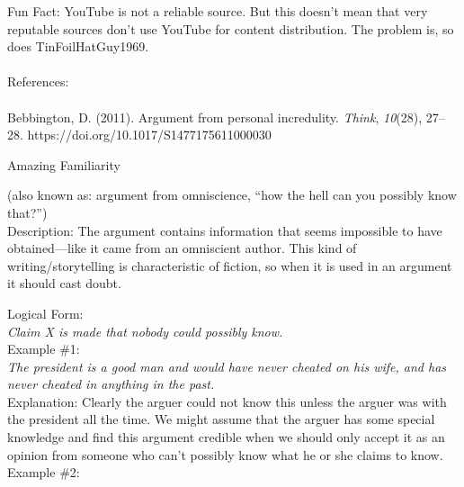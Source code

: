 \documentclass[a4paper,12pt,single,pdftex]{scrartcl}
\begin{document}
{    
      Fun Fact: YouTube is not a reliable source. But this doesn’t mean that very reputable sources don’t use YouTube for content distribution. The problem is, so does TinFoilHatGuy1969.
    \\

    
      
    \\

    
      References:
    \\

    
      
        
      \\

      
        
          Bebbington, D. (2011). Argument from personal incredulity. {\it Think}, {\it 10}(28), 27–28. https://doi.org/10.1017/S1477175611000030
        
      
    
  }


Amazing Familiarity
    
      (also known as: argument from omniscience, “how the hell can you possibly know that?”)
    \\

  
    Description: The argument contains information that seems impossible to have obtained—like it came from an omniscient author. This kind of writing/storytelling is characteristic of fiction, so when it is used in an argument it should cast doubt.

    
      Logical Form:
    \\

    
      {\em Claim X is made that nobody could possibly know.}
    \\

    
      Example \#1:
    \\

    
      {\em The president is a good man and would have never cheated on his wife, and has never cheated in anything in the past.}
    \\

    
      Explanation: Clearly the arguer could not know this unless the arguer was with the president all the time. We might assume that the arguer has some special knowledge and find this argument credible when we should only accept it as an opinion from someone who can't possibly know what he or she claims to know.
    \\

    
      Example \#2:
    \\
\end{document}
